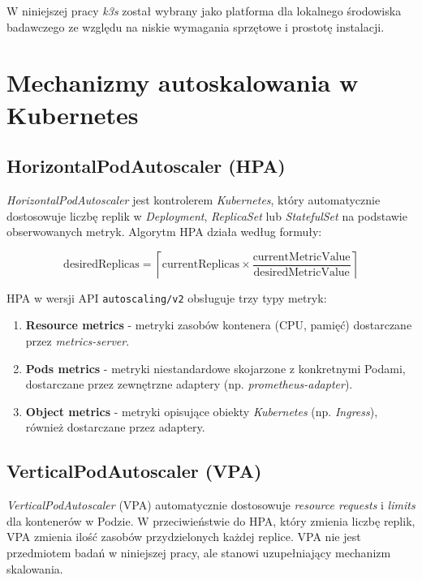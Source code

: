 W niniejszej pracy \textit{k3s} został wybrany jako platforma dla lokalnego środowiska badawczego ze względu na niskie wymagania sprzętowe i prostotę instalacji.

\section{Mechanizmy autoskalowania w Kubernetes}

\subsection{HorizontalPodAutoscaler (HPA)}

\textit{HorizontalPodAutoscaler} jest kontrolerem \textit{Kubernetes}, który automatycznie dostosowuje liczbę replik w \textit{Deployment}, \textit{ReplicaSet} lub \textit{StatefulSet} na podstawie obserwowanych metryk. Algorytm HPA działa według formuły:

\begin{equation}
  \text{desiredReplicas} = \left\lceil \text{currentReplicas} \times \frac{\text{currentMetricValue}}{\text{desiredMetricValue}} \right\rceil
\end{equation}

HPA w wersji API \texttt{autoscaling/v2} obsługuje trzy typy metryk:

\begin{enumerate}
  \item \textbf{Resource metrics} - metryki zasobów kontenera (CPU, pamięć) dostarczane przez \textit{metrics-server}.
  \item \textbf{Pods metrics} - metryki niestandardowe skojarzone z konkretnymi Podami, dostarczane przez zewnętrzne adaptery (np. \textit{prometheus-adapter}).
  \item \textbf{Object metrics} - metryki opisujące obiekty \textit{Kubernetes} (np. \textit{Ingress}), również dostarczane przez adaptery.
\end{enumerate}

\subsection{VerticalPodAutoscaler (VPA)}

\textit{VerticalPodAutoscaler} (VPA) automatycznie dostosowuje \textit{resource requests} i \textit{limits} dla kontenerów w Podzie. W przeciwieństwie do HPA, który zmienia liczbę replik, VPA zmienia ilość zasobów przydzielonych każdej replice. VPA nie jest przedmiotem badań w niniejszej pracy, ale stanowi uzupełniający mechanizm skalowania.

